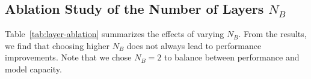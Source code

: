 \documentclass[10pt,twocolumn,letterpaper]{article}
\begin{document}
\subsection{Ablation Study of the Number of Layers $N_B$ }\vspace{-10pt}
\begin{table}[H]
    \centering
    \vspace{-5pt}
    \caption{\textbf{Effects of varying $N_B$.}
    }
    \label{tab:layer-ablation}
    \vspace{-10pt}

\end{table} Table~\ref{tab:layer-ablation} summarizes the effects of varying $N_B$. From the results, we find that choosing higher $N_B$ does not always lead to performance improvements.
Note that we chose $N_B = 2$ to balance between performance and model capacity.
\end{document}
